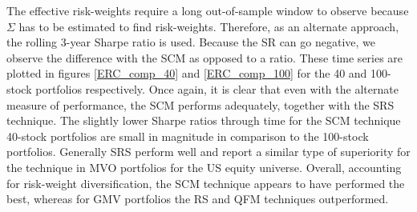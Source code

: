 \documentclass[a4paper,11pt,nocenter,bold,noupper,headcount]{mythesis}
\theoremstyle{plain}
\theoremstyle{definition}
\begin{document}
The effective risk-weights require a long out-of-sample window to observe because $\Sigma$ has to be estimated to find risk-weights. Therefore, as an alternate approach, the rolling 3-year Sharpe ratio is used. Because the SR can go negative, we observe the difference with the SCM as opposed to a ratio. These time series are plotted in figures \ref{ERC_comp_40} and \ref{ERC_comp_100} for the 40 and 100-stock portfolios respectively. Once again, it is clear that even with the alternate measure of performance, the SCM performs adequately, together with the SRS technique. The slightly lower Sharpe ratios through time for the SCM technique 40-stock portfolios are small in magnitude in comparison to the 100-stock portfolios. Generally SRS perform well and \cite{SW17} report a similar type of superiority for the technique in MVO portfolios for the US equity universe. Overall, accounting for risk-weight diversification, the SCM technique appears to have performed the best, whereas for GMV portfolios the RS and QFM techniques outperformed.
\end{document}
